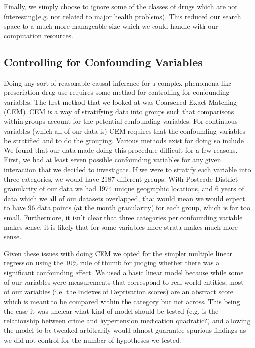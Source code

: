 \documentclass[a4paper]{article}
\begin{document}
		Finally, we simply choose to ignore some of the classes of drugs which are 
		not \'interesting\' (e.g. not related to major health problems). This reduced our 
		search space to a much more manageable size which we could handle with our computation resources.





	\subsection{Controlling for Confounding Variables}

		Doing any sort of reasonable causal inference for a complex phenomena like prescription 
		drug use requires some method for controlling for confounding variables. The first
		method that we looked at was Coarsened Exact Matching (CEM). CEM is a way of stratifying 
		data into groups such that comparisons within groups account for the potential confounding 
		variables. For continuous variables (which all of our data is) CEM requires that the 
		confounding variables be stratified and to do the grouping. Various methods
		exist for doing so include 
		. We found that our data made doing this procedure difficult for a few reasons. First,
		we had at least seven possible confounding variables for any given interaction that we decided 
		to investigate. If we were to stratify each variable into three categories, we would have 2187
		different groups. With Postcode District granularity of our data we had 1974 unique geographic 
		locations, and 6 years of data which we all of our datasets overlapped, that would mean we would
		expect to have 96 data points (at the month granularity) for each group, which is far too small. 
		Furthermore, it isn't clear that three categories per confounding variable makes sense, it is 
		likely that for some variables more strata makes much more sense. 
		
		Given these issues with doing CEM we opted for the simpler multiple linear regression using the 
		10\% rule of thumb for judging whether there was a significant confounding effect. We used a 
		basic linear model because while some of our variables were measurements that correspond to 
		real world entities, most of our variables (i.e. the Indexes of Deprivation scores) are
		an abstract score which is meant to be compared within the category but not across. This being the
		case it was unclear what kind of model should be tested (e.g. is the relationship between crime and 
		hypertension medication quadratic?) and allowing the model to be tweaked arbitrarily 
		would almost guarantee spurious findings as we did not control for the number of hypotheses we
		tested.
\end{document}
